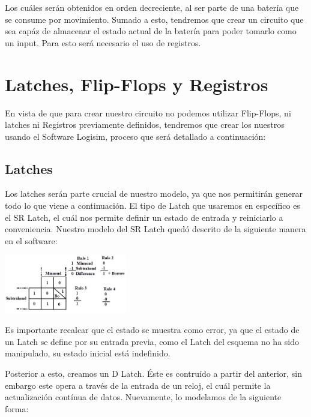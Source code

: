 \documentclass[a4paper]{article}
\begin{document}
Los cuáles serán obtenidos en orden decreciente, al ser parte de una batería que se consume por movimiento. Sumado a esto, tendremos que crear un
circuito que sea capáz de almacenar el estado actual de la batería para poder tomarlo como un input. Para esto será necesario el uso de registros.

\newpage

\section{Latches, Flip-Flops y Registros}

En vista de que para crear nuestro circuito no podemos utilizar Flip-Flops, ni latches ni Registros previamente definidos, tendremos que crear
los nuestros usando el Software Logisim, proceso que será detallado a continuación:

\subsection*{Latches}

Los latches serán parte crucial de nuestro modelo, ya que nos permitirán generar todo lo que viene a continuación. El tipo de Latch que usaremos
en específico es el SR Latch, el cuál nos permite definir un estado de entrada y reiniciarlo a conveniencia. Nuestro modelo del SR Latch quedó descrito de la siguiente manera en el software:

\begin{center}
	\includegraphics[width=0.4\textwidth]{tarea-2-ej-1.jpg}
\end{center}

Es importante recalcar que el estado se muestra como error, ya que el estado de un Latch se define por su entrada previa, como el Latch del esquema
no ha sido manipulado, su estado inicial está indefinido.

Posterior a esto, creamos un D Latch. Éste es contruído a partir del anterior, sin embargo este opera a través de la entrada de un reloj, el cuál permite
la actualización contínua de datos. Nuevamente, lo modelamos de la siguiente forma:
\end{document}
